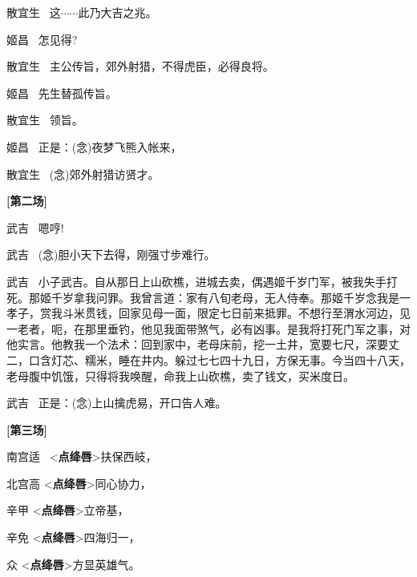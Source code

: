{散宜生\hspace{20pt}~ 这$\cdots{}\cdots{}$此乃大吉之兆。

姬昌\hspace{30pt}~ 怎见得?

散宜生\hspace{20pt}~ 主公传旨，郊外射猎，不得虎臣，必得良将。

姬昌\hspace{30pt}~ 先生替孤传旨。

散宜生\hspace{20pt}~ 领旨。

姬昌\hspace{30pt}~ 正是：({\akai 念})夜梦飞熊入帐来，

	散宜生\hspace{20pt}~ ({\akai 念})郊外射猎访贤才。

	\centerline{\textbf{{[}{\hei 第二场}{]}}}

武吉\hspace{30pt}~ 嗯哼!

武吉\hspace{30pt}~ ({\akai 念})胆小天下去得，刚强寸步难行。

\setlength{\hangindent}{60pt}   %
{武吉\hspace{30pt}~ 小子武吉。自从那日上山砍樵，进城去卖，偶遇姬千岁门军，被我失手打死。那姬千岁拿我问罪。我曾言道：家有八旬老母，无人侍奉。那姬千岁念我是一孝子，赏我斗米贯钱，回家见母一面，限定七日前来抵罪。不想行至渭水河边，见一老者，呃，在那里垂钓，他见我面带煞气，必有凶事。是我将打死门军之事，对他实言。他教我一个法术：回到家中，老母床前，挖一土井，宽要七尺，深要丈二，口含灯芯、糯米，睡在井内。躲过七七四十九日，方保无事。今当四十八天，老母腹中饥饿，只得将我唤醒，命我上山砍樵，卖了钱文，买米度日。}

武吉\hspace{30pt}~ 正是：({\akai 念})上山擒虎易，开口告人难。

	\centerline{\textbf{{[}{\hei 第三场}{]}}}

	南宫适\hspace{20pt}~  \textless{}{\bfseries\akai 点绛唇}\textgreater{}扶保西岐，

北宫高 \textless{}\textbf{点绛唇}\textgreater{}同心协力，

辛甲 \textless{}\textbf{点绛唇}\textgreater{}立帝基，

辛免 \textless{}\textbf{点绛唇}\textgreater{}四海归一，

众 \textless{}\textbf{点绛唇}\textgreater{}方显英雄气。

}
